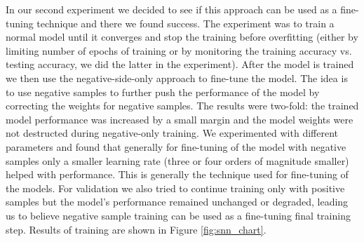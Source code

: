 \documentclass[b5paper]{book}
\begin{document}
In our second experiment we decided to see if this approach can be used as a fine-tuning technique and there we found success. The experiment was to train a normal model until it converges and stop the training before overfitting (either by limiting number of epochs of training or by monitoring the training accuracy vs. testing accuracy, we did the latter in the experiment). After the model is trained we then use the negative-side-only approach to fine-tune the model. The idea is to use negative samples to further push the performance of the model by correcting the weights for negative samples. The results were two-fold: the trained model performance was increased by a small margin and the model weights were not destructed during negative-only training. We experimented with different parameters and found that generally for fine-tuning of the model with negative samples only a smaller learning rate (three or four orders of magnitude smaller) helped with performance. This is generally the technique used for fine-tuning of the models. For validation we also tried to continue training only with positive samples but the model's performance remained unchanged or degraded, leading us to believe negative sample training can be used as a fine-tuning final training step. Results of training are shown in Figure \ref{fig:snn_chart}.
\end{document}
